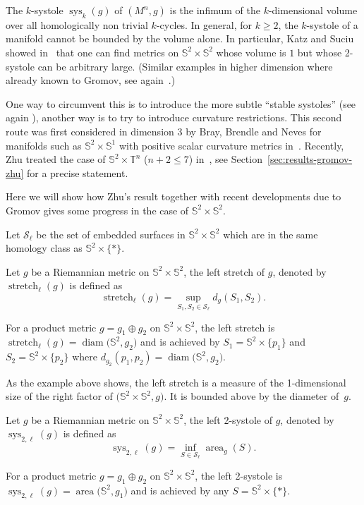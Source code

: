 \documentclass[pdftex]{sigma}
\numberwithin{equation}{section}
\DeclareMathOperator{\diam}{diam}
\DeclareMathOperator{\aire}{area}
\DeclareMathOperator{\sys}{sys}
\DeclareMathOperator{\str}{stretch}
\begin{document}
The $k$-systole $\sys_k(g)$ of $(M^n,g)$ is the infimum of the
$k$-dimensional volume over all homologically
non trivial $k$-cycles. In general, for
$k\geq 2$, the $k$-systole of a manifold cannot be bounded by the
volume alone. In particular, Katz and Suciu showed in~\cite{katz1999volume} that one can find
metrics on $\mathbb{S}^2\times\mathbb{S}^2$ whose volume is $1$ but
whose 2-systole can be arbitrary large. (Similar examples in higher
dimension where already known to Gromov, see again~\cite{berger1993systoles}.)

One way to circumvent this is to introduce the more subtle ``stable
systoles'' (see again \cite{berger1993systoles}), another way is to
try to introduce curvature restrictions. This second route was first
considered in dimension $3$ by Bray, Brendle and Neves for manifolds
such as $\mathbb{S}^2\times\mathbb{S}^1$ with positive scalar
curvature metrics in~\cite{bray2010rigidity}. Recently, Zhu treated the case of
$\mathbb{S}^2\times\mathbb{T}^n$ ($n+2\leq 7$) in~\cite{zhu2020rigidity}, see Section~\ref{sec:results-gromov-zhu} for a
precise statement.

Here we will show how Zhu's result together with recent developments
due to Gromov gives some progress in the case of $\mathbb{S}^2\times\mathbb{S}^2$.

Let $\mathcal{S}_\ell$ be the set of embedded surfaces in
$\mathbb{S}^2\times\mathbb{S}^2$ which are in the same homology class
as $\mathbb{S}^2\times\{\ast\}$.

\begin{dfn}
 Let $g$ be a Riemannian metric on
 $\mathbb{S}^2\times\mathbb{S}^2$, the left stretch of $g$, denoted
 by $\str_{\ell}(g)$ is defined as
 \[\str_{\ell}(g)=\sup_{S_1,S_2\in\mathcal{S}_\ell}d_g\left(S_1,S_2\right).\]
\end{dfn}
\begin{ex}
 For a product metric $g=g_1\oplus g_2$ on
 $\mathbb{S}^2\times\mathbb{S}^2$, the left stretch is
 $\str_{\ell}(g)=\diam\big(\mathbb{S}^2,g_2\big)$ and is achieved by
 $S_1=\mathbb{S}^2\times\{p_1\}$ and $S_2=\mathbb{S}^2\times\{p_2\}$
 where $d_{g_2}(p_1,p_2)=\diam\big(\mathbb{S}^2,g_2\big)$.
\end{ex}
As the example above shows, the left stretch is a measure of the
1-dimensional size of the right factor of $\big(\mathbb{S}^2\times
\mathbb{S}^2,g\big)$. It is bounded above by the diameter of~$g$.
\begin{dfn}\label{dfn-str}
 Let $g$ be a Riemannian metric on
 $\mathbb{S}^2\times\mathbb{S}^2$, the left 2-systole of $g$, denoted
 by $\sys_{2,\ell}(g)$ is defined as
 \[\sys_{2,\ell}(g)=\inf_{S\in\mathcal{S}_\ell}\aire_g(S).\]
\end{dfn}
\begin{ex}
 For a product metric $g=g_1\oplus g_2$ on
 $\mathbb{S}^2\times\mathbb{S}^2$, the left 2-systole is
 $\sys_{2,\ell}(g)=\aire\big(\mathbb{S}^2,g_1\big)$ and is achieved by
 any $S=\mathbb{S}^2\times\{\ast\}$.
\end{ex}
\end{document}
